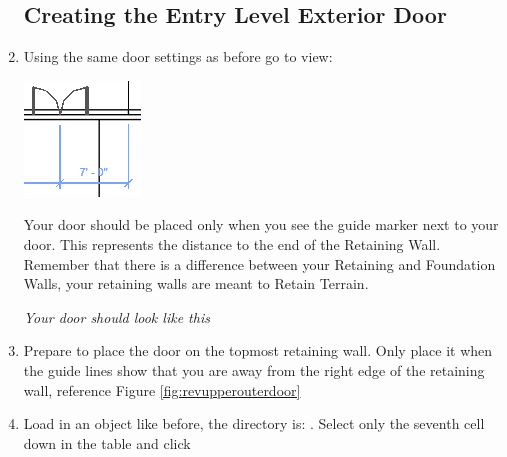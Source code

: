 \documentclass{tufte-book} %
\begin{document}
\begin{enumerate}
	\subsection{Creating the Entry Level Exterior Door}
		\item Using the same door settings as before go to view: 
		\begin{marginfigure}
			\includegraphics[width=\linewidth]{revitupperlevelexteriordoor.png}
			\caption [Entry Level Exterior Door] {Your door should be placed only when you see the  guide marker next to your door. This represents the distance to the end of the Retaining Wall. Remember that there is a difference between your Retaining and Foundation Walls, your retaining walls are meant to Retain Terrain.}
			\emph{Your door should look like this}
			\label{fig:revupperouterdoor}
		\end{marginfigure}
		\item Prepare to place the door on the topmost retaining wall. Only place it when the guide lines show that you are  away from the right edge of the retaining wall, reference Figure \ref{fig:revupperouterdoor}
		\item Load in an object like before, the directory is: . Select only the seventh cell down in the table and click 

\end{enumerate}
\end{document}
